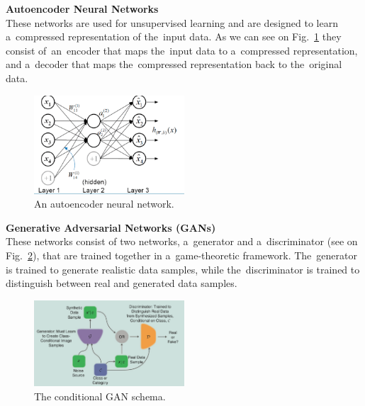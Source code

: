     \textbf{Autoencoder Neural Networks}\\
    These networks are used for unsupervised learning and are designed to learn a~compressed representation of the~input data. As we can see on Fig.~\ref{fig:ann} they consist of~an~encoder that maps the~input data to a~compressed representation, and a~decoder that maps the~compressed representation back to the~original data.
    \begin{center}
        \begin{figure}[!ht]
            \centering
            \includegraphics[width=0.5\textwidth]{figures/ann}
            \caption{An autoencoder neural network. \cite{luo2018distributed}}
            \label{fig:ann}
        \end{figure}
    \end{center}
    \textbf{Generative Adversarial Networks (GANs)}\\
    These networks consist of two networks, a~generator and a~discriminator (see on Fig.~\ref{fig:gan}), that are trained together in a~game-theoretic framework. The~generator is trained to generate realistic data samples, while the~discriminator is trained to distinguish between real and generated data samples.
    \begin{center}
        \begin{figure}[!ht]
            \centering
            \includegraphics[width=0.5\textwidth]{figures/gan}
            \caption{The conditional GAN schema. \cite{creswell2018generative}}
            \label{fig:gan}
        \end{figure}
    \end{center}
    
